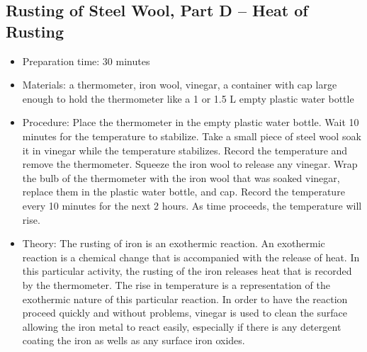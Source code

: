 \subsection{Rusting of Steel Wool, Part D – Heat of Rusting}
\begin{itemize}
\item{Preparation time: 30 minutes}
\item{Materials: a thermometer, iron wool, vinegar, a container with cap large enough to hold the thermometer like a 1 or 1.5 L empty plastic water bottle}
\item{Procedure: Place the thermometer in the empty plastic water bottle. Wait 10 minutes for the temperature to stabilize. Take a small piece of steel wool soak it in vinegar while the temperature stabilizes. Record the temperature and remove the thermometer. Squeeze the iron wool to release any vinegar. Wrap the bulb of the thermometer with the iron wool that was soaked vinegar, replace them in the plastic water bottle, and cap. Record the temperature every 10 minutes for the next 2 hours. As time proceeds, the temperature will rise.}
\item{Theory: The rusting of iron is an exothermic reaction. An exothermic reaction is a chemical change that is accompanied with the release of heat. In this particular activity, the rusting of the iron releases heat that is recorded by the thermometer. The rise in temperature is a representation of the exothermic nature of this particular reaction. In order to have the reaction proceed quickly and without problems, vinegar is used to clean the surface allowing the iron metal to react easily, especially if there is any detergent coating the iron as wells as any surface iron oxides.}
\end{itemize}

